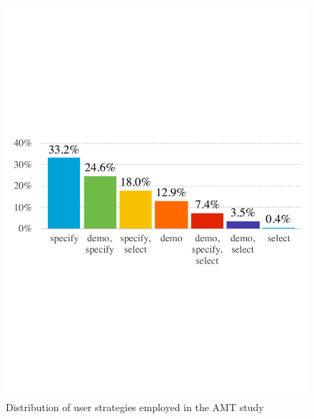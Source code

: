 \begin{figure}
	\centering
	\includegraphics[width=0.7\linewidth]{figures/strategies}
	\caption{Distribution of user strategies employed in the AMT study}
	\label{fig:strategies}
\end{figure}



